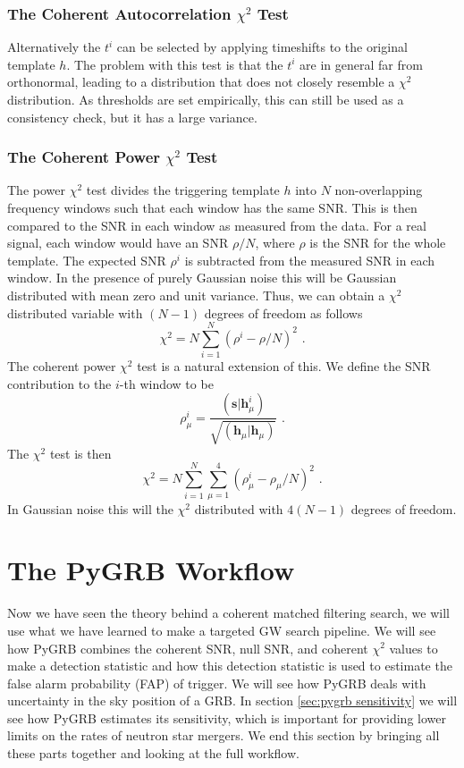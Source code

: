 \documentclass[11pt]{cuthesis}
\newcommand{\fs}{\text{ .}}
\begin{document}
\subsubsection{The Coherent Autocorrelation $\chi^2$ Test}
Alternatively the $t^i$ can be selected by applying timeshifts to the original template $h$. The problem with this test is that the $t^i$ are in general far from orthonormal, leading to a distribution that does not closely resemble a $\chi^2$ distribution. As thresholds are set empirically, this can still be used as a consistency check, but it has a large variance.


\subsubsection{The Coherent Power $\chi^2$ Test}
The power $\chi^2$ test divides the triggering template $h$ into $N$ non-overlapping frequency windows such that each window has the same SNR. This is then compared to the SNR in each window as measured from the data. For a real signal, each window would have an SNR $\rho/N$, where $\rho$ is the SNR for the whole template. The expected SNR $\rho^i$ is subtracted from the measured SNR in each window. In the presence of purely Gaussian noise this will be Gaussian distributed with mean zero and unit variance. Thus, we can obtain a $\chi^2$ distributed variable with $(N-1)$ degrees of freedom as follows
\begin{equation}
\chi^2 = N \sum_{i=1}^N (\rho^i - \rho/N)^2 \fs
\end{equation}
The coherent power $\chi^2$ test is a natural extension of this. We define the SNR contribution to the $i$-th window to be
\begin{equation}
\rho^i_\mu = \frac{(\textbf{s}|\textbf{h}^i_\mu)}{\sqrt{(\textbf{h}_\mu|\textbf{h}_\mu)}} \fs
\end{equation}
The $\chi^2$ test is then
\begin{equation}
\chi^2 = N \sum_{i=1}^N \sum_{\mu=1}^4 (\rho^i_\mu - \rho_\mu/N)^2 \fs
\end{equation}
In Gaussian noise this will the $\chi^2$ distributed with $4(N-1)$ degrees of freedom. 

\section{The PyGRB Workflow} \label{sec:pygrb workflow}
Now we have seen the theory behind a coherent matched filtering search, we will use what we have learned to make a targeted GW search pipeline. We will see how PyGRB combines the coherent SNR, null SNR, and coherent $\chi^2$ values to make a detection statistic and how this detection statistic is used to estimate the false alarm probability (FAP) of trigger. We will see how PyGRB deals with uncertainty in the sky position of a GRB. In section \ref{sec:pygrb sensitivity} we will see how PyGRB estimates its sensitivity, which is important for providing lower limits on the rates of neutron star mergers. We end this section by bringing all these parts together and looking at the full workflow.
\end{document}
